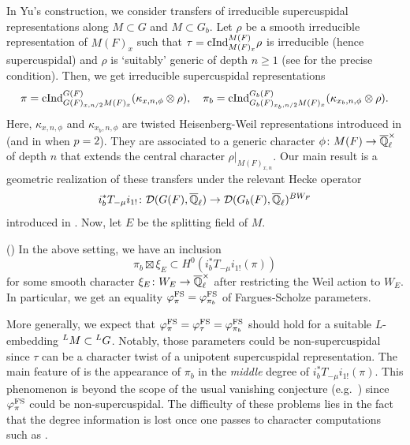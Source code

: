 \documentclass[12pt,reqno]{amsart}
\begin{document}
In Yu's construction, we consider transfers of irreducible supercuspidal representations along $M \subset G$ and $M \subset G_b$. Let $\rho$ be a smooth irreducible representation of $M(F)_x$ such that $\tau = {\operatorname{cInd}}_{M(F)_x}^{M(F)} \rho$ is irreducible (hence supercuspidal) and $\rho$ is `suitably' generic of depth $n \geq 1$ (see  for the precise condition). 
Then, we get irreducible supercuspidal representations
\[
    \pi = {\operatorname{cInd}}_{G(F)_{x, n/2} M(F)_x}^{G(F)} (\kappa_{x, n, \phi} \otimes \rho) ,\quad 
    \pi_b = {\operatorname{cInd}}_{G_b(F)_{x_b, n/2} M(F)_x}^{G_b(F)} (\kappa_{x_b, n, \phi} \otimes \rho). 
\]
Here, $\kappa_{x, n, \phi}$ and $\kappa_{x_b, n, \phi}$ are twisted Heisenberg-Weil representations introduced in \cite{FKS23} (and in \cite{Tak26_Yu} when $p = 2$). They are associated to a generic character $\phi \colon M(F) \to {\overline{\mathbb{Q}}_\ell^\times}$ of depth $n$ that extends the central character $\rho\vert_{M(F)_{x, n}}$. Our main result is a geometric realization of these transfers under the relevant Hecke operator 
\[
    i_b^* T_{-\mu} i_{1!} \colon {\mathcal{D}}(G(F), {\overline{\mathbb{Q}}_\ell}) \to {\mathcal{D}}(G_b(F), {\overline{\mathbb{Q}}_\ell})^{BW_F}
\]
introduced in \cite{FS24}. Now, let $E$ be the splitting field of $M$.  

\begin{thm2}\textup{()} \label{thm2:middle_Hecke_operator} 
    In the above setting, we have an inclusion
    \[
        \pi_b \boxtimes \xi_E \subset H^0(i_b^* T_{-\mu} i_{1!}(\pi))
    \] 
    for some smooth character $\xi_E \colon W_E \to {\overline{\mathbb{Q}}_\ell^\times}$ after restricting the Weil action to $W_E$. In particular, we get an equality $\varphi^{\operatorname{FS}}_\pi = \varphi^{\operatorname{FS}}_{\pi_b}$ of Fargues-Scholze parameters. 
\end{thm2}

More generally, we expect that $\varphi_\pi^{\operatorname{FS}} = \varphi_\tau^{\operatorname{FS}} = \varphi_{\pi_b}^{\operatorname{FS}}$ should hold for a suitable $L$-embedding ${{}^LM} \subset {{}^LG}$. Notably, those parameters could be non-supercuspidal since $\tau$ can be a character twist of a unipotent supercuspidal representation. The main feature of  is the appearance of $\pi_b$ in the \textit{middle} degree of $i_b^* T_{-\mu} i_{1!}(\pi)$. %
This phenomenon is beyond the scope of the usual vanishing conjecture (e.g.\ \cite[Conjecture 1.1 (2)]{HJ25}) since $\varphi_\pi^{\operatorname{FS}}$ could be non-supercuspidal. The difficulty of these problems lies in the fact that the degree information is lost once one passes to character computations such as \cite{HKW22}. %
\end{document}
